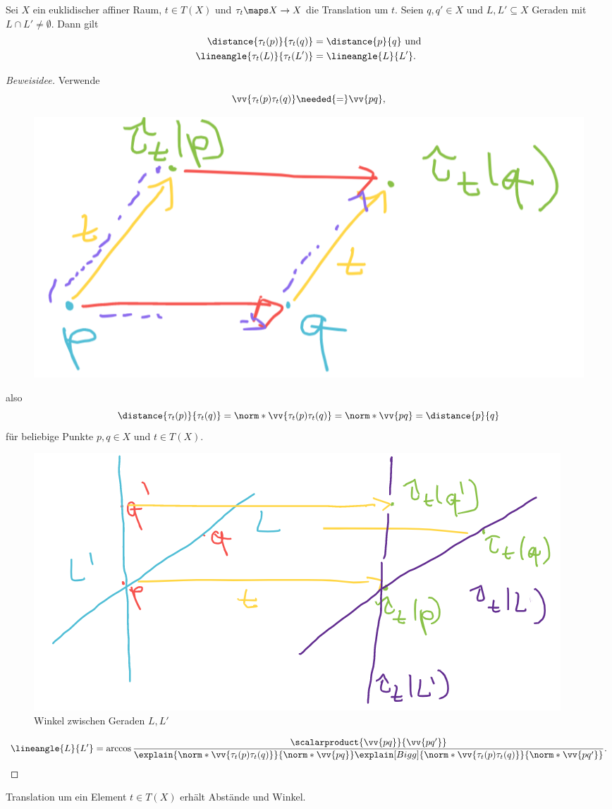 \begin{lemma}
  Sei \( X \) ein euklidischer affiner Raum, \( t\in T(X) \) und \( \tau_t\maps X\to X \) die Translation um \( t \). Seien \( q,q'\in X \) und \( L,L'\subseteq X \) Geraden mit \( L\cap L'\neq \emptyset \). Dann gilt 
  \begin{align*}
    \distance{\tau_t(p)}{\tau_t(q)}&=\distance{p}{q}\text{ und}\\
    \lineangle{\tau_t(L)}{\tau_t(L')}&=\lineangle{L}{L'}.
  \end{align*}
\end{lemma}
\begin{proof}[Beweisidee]
  Verwende
  \begin{equation*}
    \vv{\tau_t(p) \tau_t(q)}\needed{=}\vv{pq},
  \end{equation*}
  \begin{figure}[H]
    \centering
    \includegraphics[width=0.5\linewidth]{figures/translation_erhaelt_winkel_beweis_translation_erhaelt_verschiebungen}
    \label{fig:translation_erhaelt_winkel_beweis_translation_erhaelt_verschiebungen}
  \end{figure}
  also
  \begin{equation*}
    \distance{\tau_t(p)}{\tau_t(q)}=\norm*{\vv{\tau_t(p)\tau_t(q)}}=\norm*{\vv{pq}}=\distance{p}{q}
  \end{equation*}
  für beliebige Punkte \( p,q\in X \) und \( t\in T(X) \).
  \begin{figure}[H]
    \centering
    \includegraphics[width=0.5\linewidth]{figures/translation_erhaelt_winkel_beweis_winkel_zwischen_geraden}
    \caption*{Winkel zwischen Geraden \( L,L' \)}
    \label{fig:translation_erhaelt_winkel_beweis_winkel_zwischen_geraden}
  \end{figure}
  \begin{equation*}
    \lineangle{L}{L'}=\arccos \frac{\scalarproduct{\vv{pq}}{\vv{pq'}}}{\explain{\norm*{\vv{\tau_t(p)\tau_t(q)}}}{\norm*{\vv{pq}}}\explain[Bigg]{\norm*{\vv{\tau_t(p)\tau_t(q)}}}{\norm*{\vv{pq'}}}}.
  \end{equation*}
\end{proof}
 Translation um ein Element \( t\in T(X) \) erhält Abstände und Winkel.

